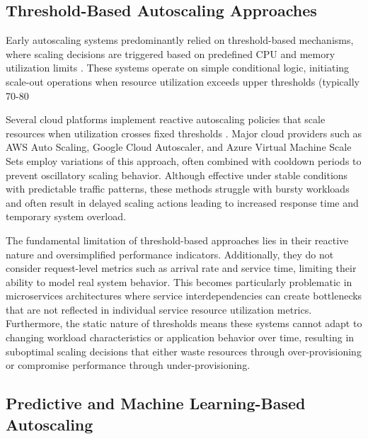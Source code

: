 \subsection{Threshold-Based Autoscaling Approaches}

Early autoscaling systems predominantly relied on threshold-based mechanisms, where scaling decisions are triggered based on predefined CPU and memory utilization limits \cite{khaleq2021}. These systems operate on simple conditional logic, initiating scale-out operations when resource utilization exceeds upper thresholds (typically 70-80%

Several cloud platforms implement reactive autoscaling policies that scale resources when utilization crosses fixed thresholds \cite{fourati2021}. Major cloud providers such as AWS Auto Scaling, Google Cloud Autoscaler, and Azure Virtual Machine Scale Sets employ variations of this approach, often combined with cooldown periods to prevent oscillatory scaling behavior. Although effective under stable conditions with predictable traffic patterns, these methods struggle with bursty workloads and often result in delayed scaling actions leading to increased response time and temporary system overload.

The fundamental limitation of threshold-based approaches lies in their reactive nature and oversimplified performance indicators. Additionally, they do not consider request-level metrics such as arrival rate and service time, limiting their ability to model real system behavior. This becomes particularly problematic in microservices architectures where service interdependencies can create bottlenecks that are not reflected in individual service resource utilization metrics. Furthermore, the static nature of thresholds means these systems cannot adapt to changing workload characteristics or application behavior over time, resulting in suboptimal scaling decisions that either waste resources through over-provisioning or compromise performance through under-provisioning.

\subsection{Predictive and Machine Learning-Based Autoscaling}

